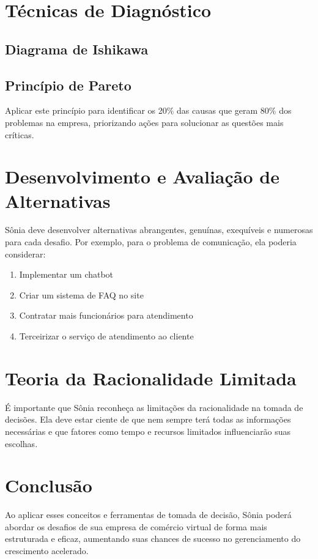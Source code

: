 \documentclass[11pt]{article}
\begin{document}
\section{Técnicas de Diagnóstico}

\subsection{Diagrama de Ishikawa}




\subsection{Princípio de Pareto}
Aplicar este princípio para identificar os 20\% das causas que geram 80\% dos problemas na empresa, priorizando ações para solucionar as questões mais críticas.

\section{Desenvolvimento e Avaliação de Alternativas}

Sônia deve desenvolver alternativas abrangentes, genuínas, exequíveis e numerosas para cada desafio. Por exemplo, para o problema de comunicação, ela poderia considerar:

\begin{enumerate}
    \item Implementar um chatbot
    \item Criar um sistema de FAQ no site
    \item Contratar mais funcionários para atendimento
    \item Terceirizar o serviço de atendimento ao cliente
\end{enumerate}

\section{Teoria da Racionalidade Limitada}

É importante que Sônia reconheça as limitações da racionalidade na tomada de decisões. Ela deve estar ciente de que nem sempre terá todas as informações necessárias e que fatores como tempo e recursos limitados influenciarão suas escolhas.

\section{Conclusão}

Ao aplicar esses conceitos e ferramentas de tomada de decisão, Sônia poderá abordar os desafios de sua empresa de comércio virtual de forma mais estruturada e eficaz, aumentando suas chances de sucesso no gerenciamento do crescimento acelerado.
\end{document}
